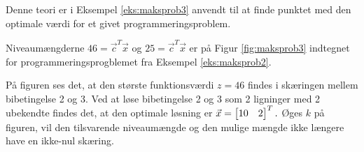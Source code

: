 %

Denne teori er i Eksempel \ref{eks:maksprob3} anvendt til at finde punktet med den optimale værdi for et givet programmeringsproblem.

\begin{eks}
Niveaumængderne $46=\vec{c}^T \vec{x}$ og $25=\vec{c}^T \vec{x}$ er på Figur \ref{fig:maksprob3} indtegnet for programmeringsprogblemet fra Eksempel \ref{eks:maksprob2}.

	\begin{center}	
		
		\label{fig:maksprob3}
	\end{center}
	
På figuren ses det, at den største funktionsværdi $z=46$ findes i skæringen mellem bibetingelse 2 og 3.
Ved at løse bibetingelse 2 og 3 som 2 ligninger med 2 ubekendte findes det, at den optimale løsning er $\vec{x}=\begin{bmatrix} 10 & 2 \end{bmatrix}^T.$
Øges $k$ på figuren, vil den tilsvarende niveaumængde og den mulige mængde ikke længere have en ikke-nul skæring. 

\label{eks:maksprob3}
\end{eks}





